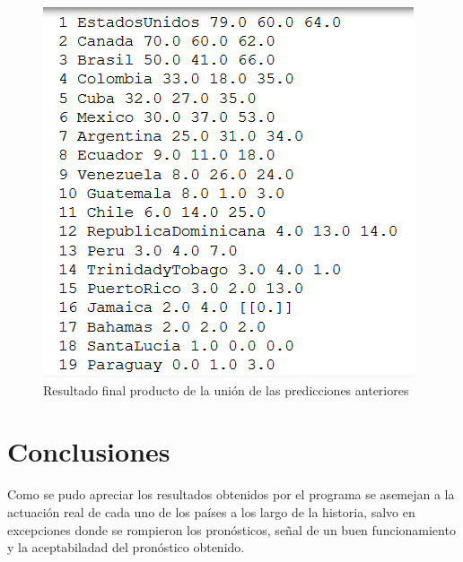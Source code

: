 \documentclass[a4paper,12pt]{article}
\begin{document}
\begin{figure}[hbtp]
\caption{Resultado final producto de la uni\'{o}n de las predicciones anteriores}
\centering
\includegraphics[scale=1]{19_primeros_prediccion_combinada.png}
\end{figure}

\newpage
\section{Conclusiones}
\cline{-} Como se pudo apreciar los resultados obtenidos por el programa se asemejan a la actuaci\'{o}n real de cada uno de los pa\'{i}ses a los largo de la historia, salvo en excepciones donde se rompieron los pron\'{o}sticos, se\~{n}al de un buen funcionamiento y la aceptabiladad del pron\'{o}stico obtenido.
\newpage
\end{document}
